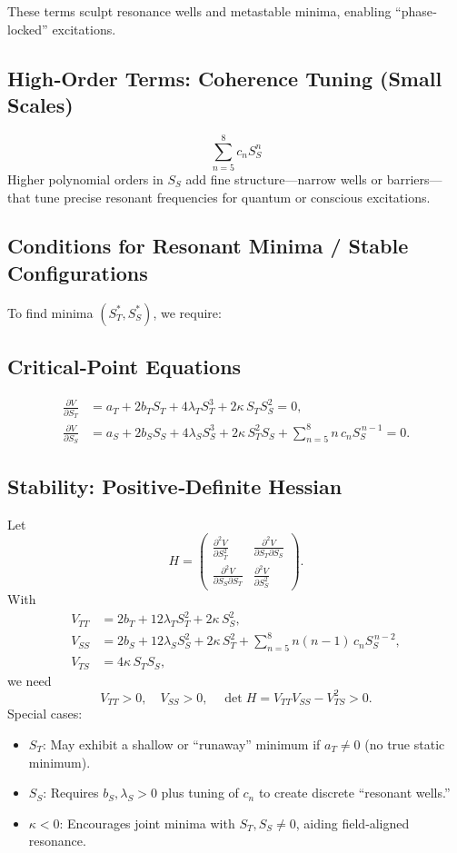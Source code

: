 \documentclass[11pt,a4paper]{article} %
\begin{document}
These terms sculpt resonance wells and metastable minima, enabling “phase‐locked” excitations.

\subsection{High‐Order Terms: Coherence Tuning (Small Scales)}
\[
\sum_{n=5}^8 c_n S_S^n
\]
Higher polynomial orders in $S_S$ add fine structure—narrow wells or barriers—that tune precise resonant frequencies for quantum or conscious excitations.

\subsection{Conditions for Resonant Minima / Stable Configurations}
To find minima $(S_T^*,S_S^*)$, we require:

\subsection{Critical‐Point Equations}
\begin{align}
\frac{\partial V}{\partial S_T}
  &= a_T + 2b_T S_T + 4\lambda_T S_T^3 + 2\kappa\,S_T S_S^2
  = 0,\\
\frac{\partial V}{\partial S_S}
  &= a_S + 2b_S S_S + 4\lambda_S S_S^3 
    + 2\kappa\,S_T^2 S_S 
    + \sum_{n=5}^8 n\,c_n S_S^{\,n-1}
  = 0.
\end{align}

\subsection{Stability: Positive‐Definite Hessian}
Let
\[
H = \begin{pmatrix}
\frac{\partial^2 V}{\partial S_T^2} 
  & \frac{\partial^2 V}{\partial S_T\partial S_S} \\[6pt]
\frac{\partial^2 V}{\partial S_S\partial S_T} 
  & \frac{\partial^2 V}{\partial S_S^2}
\end{pmatrix}.
\]
With
\begin{align*}
V_{TT} &= 2b_T + 12\lambda_T S_T^2 + 2\kappa\,S_S^2,\\
V_{SS} &= 2b_S + 12\lambda_S S_S^2 + 2\kappa\,S_T^2 
         + \sum_{n=5}^8 n(n-1)\,c_n S_S^{\,n-2},\\
V_{TS} &= 4\kappa\,S_T S_S,
\end{align*}
we need
\[
V_{TT}>0,\quad V_{SS}>0,\quad \det H = V_{TT}V_{SS} - V_{TS}^2 > 0.
\]
Special cases:
\begin{itemize}
  \item $S_T$: May exhibit a shallow or “runaway” minimum if $a_T\neq0$ (no true static minimum).
  \item $S_S$: Requires $b_S,\lambda_S>0$ plus tuning of $c_n$ to create discrete “resonant wells.”
  \item $\kappa<0$: Encourages joint minima with $S_T,S_S\neq0$, aiding field‐aligned resonance.
\end{itemize}
\end{document}
